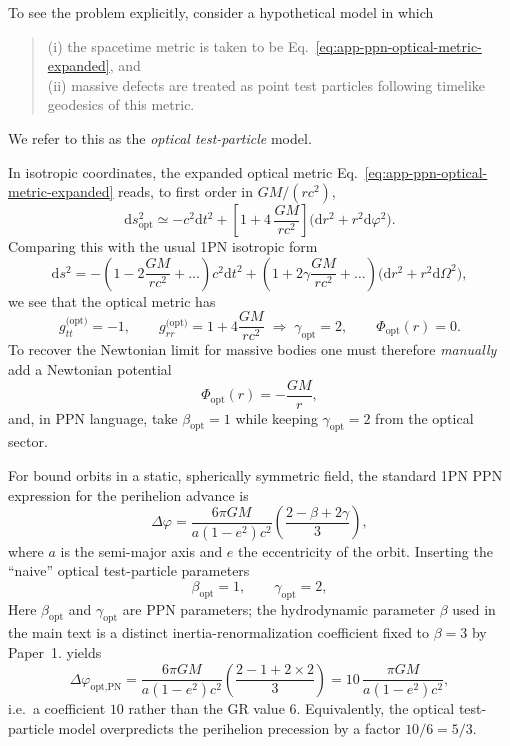 \documentclass[11pt]{article}
\begin{document}
To see the problem explicitly, consider a hypothetical model in which
\begin{quote}
  (i) the spacetime metric is taken to be
  Eq.~\eqref{eq:app-ppn-optical-metric-expanded}, and \\
  (ii) massive defects are treated as point test particles following
  timelike geodesics of this metric.
\end{quote}
We refer to this as the \emph{optical test-particle} model.

In isotropic coordinates, the expanded optical metric
Eq.~\eqref{eq:app-ppn-optical-metric-expanded} reads, to first order in
$GM/(r c^2)$,
\begin{equation}
  \mathrm{d}s^2_{\text{opt}}
  \simeq -c^2 \mathrm{d}t^2
    + \left[1 + 4\,\frac{GM}{r c^2}\right]
      \bigl(\mathrm{d}r^2 + r^2 \mathrm{d}\varphi^2\bigr).
\end{equation}
Comparing this with the usual 1PN isotropic form
\begin{equation}
  \mathrm{d}s^2
  = -\left(1 - 2\frac{GM}{r c^2} + \dots\right)c^2 \mathrm{d}t^2
    + \left(1 + 2\gamma\frac{GM}{r c^2} + \dots\right)
      \bigl(\mathrm{d}r^2 + r^2 \mathrm{d}\Omega^2\bigr),
  \label{eq:app-ppn-general-metric-again}
\end{equation}
we see that the optical metric has
\begin{equation}
  g_{tt}^{\text{(opt)}} = -1,
  \qquad
  g_{rr}^{\text{(opt)}} = 1 + 4\frac{GM}{r c^2}
  \;\Rightarrow\;
  \gamma_{\text{opt}} = 2,
  \qquad
  \Phi_{\text{opt}}(r) = 0.
\end{equation}
To recover the Newtonian limit for massive bodies one must therefore
\emph{manually} add a Newtonian potential
\begin{equation}
  \Phi_{\text{opt}}(r) = -\frac{GM}{r},
\end{equation}
and, in PPN language, take $\beta_{\text{opt}} = 1$ while keeping
$\gamma_{\text{opt}} = 2$ from the optical sector.

For bound orbits in a static, spherically symmetric field, the standard
1PN PPN expression for the perihelion advance is
\begin{equation}
  \Delta\varphi
  = \frac{6\pi GM}{a(1-e^2)c^2}
    \left(\frac{2 - \beta + 2\gamma}{3}\right),
\end{equation}
where $a$ is the semi-major axis and $e$ the eccentricity of the orbit.
Inserting the ``naive'' optical test-particle parameters
\begin{equation}
  \beta_{\text{opt}} = 1,
  \qquad
  \gamma_{\text{opt}} = 2,
\end{equation}
Here $\beta_{\text{opt}}$ and $\gamma_{\text{opt}}$ are PPN parameters; the
hydrodynamic parameter $\beta$ used in the main text is a distinct
inertia-renormalization coefficient fixed to $\beta=3$ by Paper~1.
yields
\begin{equation}
  \Delta\varphi_{\text{opt,PN}}
  = \frac{6\pi GM}{a(1-e^2)c^2}
    \left(\frac{2 - 1 + 2\times 2}{3}\right)
  = 10\,\frac{\pi GM}{a(1-e^2)c^2},
\end{equation}
i.e.\ a coefficient $10$ rather than the GR value $6$.
Equivalently, the optical test-particle model overpredicts the perihelion
precession by a factor $10/6 = 5/3$.
\end{document}
